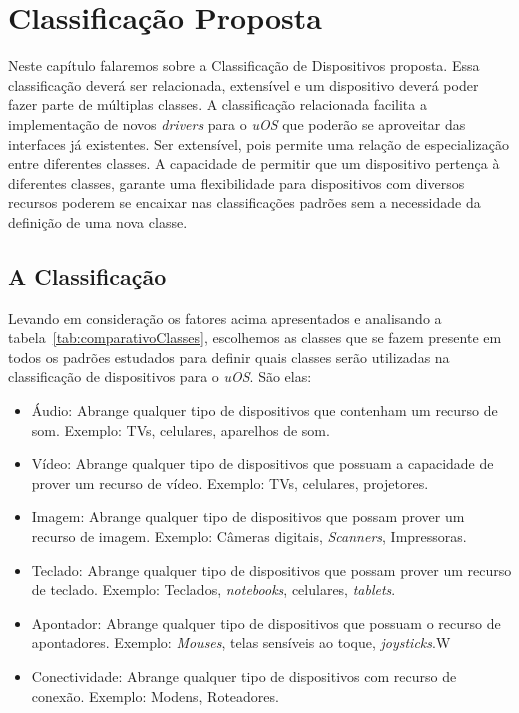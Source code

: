 \chapter{Classificação Proposta}

Neste capítulo falaremos sobre a Classificação de Dispositivos proposta. Essa classificação deverá ser relacionada, extensível e um dispositivo deverá poder fazer parte de múltiplas classes. A classificação relacionada facilita a implementação de novos \emph{drivers} para o \emph{uOS} que poderão se aproveitar das interfaces já existentes. Ser extensível, pois permite uma relação de especialização entre diferentes classes. A capacidade de permitir que um dispositivo pertença à diferentes classes, garante uma flexibilidade para dispositivos com diversos recursos poderem se encaixar nas classificações padrões sem a necessidade da definição de uma nova classe.


\section{A Classificação}
Levando em consideração os fatores acima apresentados e analisando a tabela~\ref{tab:comparativoClasses}, escolhemos as classes que se fazem presente em todos os padrões estudados para definir quais classes serão utilizadas na classificação de dispositivos para o \emph{uOS}. São elas:

\begin{itemize}
	\item Áudio:
		Abrange qualquer tipo de dispositivos que contenham um recurso de som. Exemplo: TVs, celulares, aparelhos de som.
	\item Vídeo:
		Abrange qualquer tipo de dispositivos que possuam a capacidade de prover um recurso de vídeo. Exemplo: TVs, celulares, projetores.
	\item Imagem:
		Abrange qualquer tipo de dispositivos que possam prover um recurso de imagem. Exemplo: Câmeras digitais, \emph{Scanners}, Impressoras.
	\item Teclado:
		Abrange qualquer tipo de dispositivos que possam prover um recurso de teclado. Exemplo: Teclados, \emph{notebooks}, celulares, \emph{tablets}.
	\item Apontador:
		Abrange qualquer tipo de dispositivos que possuam o recurso de apontadores. Exemplo: \emph{Mouses}, telas sensíveis ao toque, \emph{joysticks}.W
	\item Conectividade:
		Abrange qualquer tipo de dispositivos com recurso de conexão. Exemplo: Modens, Roteadores.
\end{itemize}